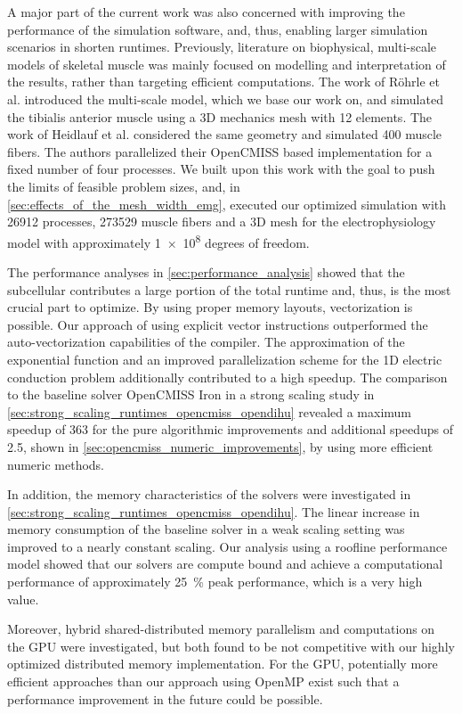 A major part of the current work was also concerned with improving the performance of the simulation software, and, thus, enabling larger simulation scenarios in shorten runtimes.
Previously, literature on biophysical, multi-scale models of skeletal muscle was mainly focused on modelling and interpretation of the results, rather than targeting efficient computations. The work of Röhrle et al. \cite{Roehrle2012} introduced the multi-scale model, which we base our work on, and simulated the tibialis anterior muscle using a 3D mechanics mesh with 12 elements. The work of Heidlauf et al. \cite{Heidlauf2013} considered the same geometry and simulated 400 muscle fibers. The authors parallelized their OpenCMISS based implementation for a fixed number of four processes. We built upon this work with the goal to push the limits of feasible problem sizes, and, in \cref{sec:effects_of_the_mesh_width_emg}, executed our optimized simulation with \num{26912} processes, \num{273529} muscle fibers and a 3D mesh for the electrophysiology model with approximately \num{1e8} degrees of freedom.

The performance analyses in \cref{sec:performance_analysis} showed that the subcellular contributes a large portion of the total runtime and, thus, is the most crucial part to optimize. By using proper memory layouts, vectorization is possible. Our approach of using explicit vector instructions outperformed the auto-vectorization capabilities of the compiler. The approximation of the exponential function and an improved parallelization scheme for the 1D electric conduction problem additionally contributed to a high speedup. The comparison to the baseline solver OpenCMISS Iron in a strong scaling study in \cref{sec:strong_scaling_runtimes_opencmiss_opendihu} revealed a maximum speedup of 363 for the pure algorithmic improvements and additional speedups of 2.5, shown in \cref{sec:opencmiss_numeric_improvements}, by using more efficient numeric methods.

In addition, the memory characteristics of the solvers were investigated in \cref{sec:strong_scaling_runtimes_opencmiss_opendihu}. 
The linear increase in memory consumption of the baseline solver in a weak scaling setting was improved to a nearly constant scaling. Our analysis using a roofline performance model showed that our solvers are compute bound and achieve a computational performance of approximately \SI{25}{\percent} peak performance, which is a very high value.

Moreover, hybrid shared-distributed memory parallelism and computations on the GPU were investigated, but both found to be not competitive with our highly optimized distributed memory implementation. For the GPU, potentially more efficient approaches than our approach using OpenMP exist such that a performance improvement in the future could be possible.

